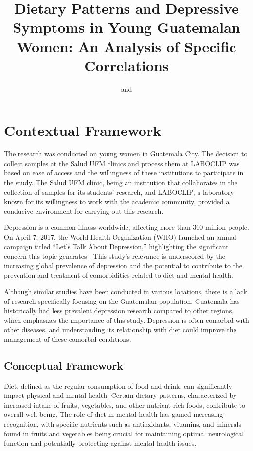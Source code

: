 \documentclass[jou]{apa7}
\title{Dietary Patterns and Depressive Symptoms in Young Guatemalan Women: An Analysis of Specific Correlations}
\author{
	\addORCIDlink{Camila Heredia, M.D.}{0009-0008-9550-9083} and \addORCIDlink{Lic. María Andrée Neumann}{0009-0001-2531-6058}
}
\affiliation{Graduate School, Universidad Francisco Marroquín}
\begin{document}
	\maketitle



	\section{Contextual Framework}\label{marco-contextual}

	The research was conducted on young women in Guatemala City. The decision to collect samples at the Salud UFM clinics and process them at LABOCLIP was based on ease of access and the willingness of these institutions to participate in the study. The Salud UFM clinic, being an institution that collaborates in the collection of samples for its students' research, and LABOCLIP, a laboratory known for its willingness to work with the academic community, provided a conducive environment for carrying out this research.

	Depression is a common illness worldwide, affecting more than 300 million people. On April 7, 2017, the World Health Organization (WHO) launched an annual campaign titled ``Let's Talk About Depression,'' highlighting the significant concern this topic generates \parencite{Toshi2022}. This study's relevance is underscored by the increasing global prevalence of depression and the potential to contribute to the prevention and treatment of comorbidities related to diet and mental health.

	Although similar studies have been conducted in various locations, there is a lack of research specifically focusing on the Guatemalan population. Guatemala has historically had less prevalent depression research compared to other regions, which emphasizes the importance of this study. Depression is often comorbid with other diseases, and understanding its relationship with diet could improve the management of these comorbid conditions.

	\subsection{Conceptual Framework}

	Diet, defined as the regular consumption of food and drink, can significantly impact physical and mental health. Certain dietary patterns, characterized by increased intake of fruits, vegetables, and other nutrient-rich foods, contribute to overall well-being. The role of diet in mental health has gained increasing recognition, with specific nutrients such as antioxidants, vitamins, and minerals found in fruits and vegetables being crucial for maintaining optimal neurological function and potentially protecting against mental health issues.
\end{document}
